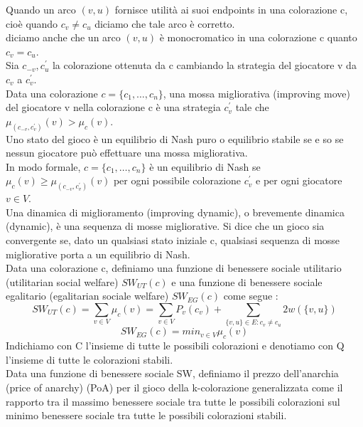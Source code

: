 Quando un arco \((v, u)\) fornisce utilità ai suoi endpoints in una colorazione c, cioè quando \(c_v \neq c_u\) diciamo che tale arco è corretto.\\

diciamo anche che un arco \((v, u)\) è monocromatico in una colorazione c quanto \(c_v = c_u\).\\

Sia \(c_{-v}, c_u^{\prime}\) la colorazione ottenuta da c cambiando la strategia del giocatore v da \(c_v\) a \(c_v^{\prime}\).\\

Data una colorazione \(c = \{c_1,\ldots,c_n\}\), una mossa migliorativa (improving move) del giocatore v nella colorazione c è una strategia \(c_v^{\prime}\) tale che \(\mu_{(c_{-v}, c_v^{\prime})} (v) > \mu_c (v)\).\\

Uno stato del gioco è un equilibrio di Nash puro o equilibrio stabile se e so se nessun giocatore può effettuare una mossa migliorativa.\\

In modo formale, \(c = \{c_1,\ldots,c_n\}\) è un equilibrio di Nash se \(\mu_c (v) \geq \mu_{(c_{-v}, c_v^{\prime})} (v)\) per ogni possibile colorazione \(c_v^{\prime}\) e per ogni giocatore \(v \in V\).\\

Una dinamica di miglioramento (improving dynamic), o brevemente dinamica (dynamic), è una sequenza di mosse migliorative. Si dice che un gioco sia convergente se, dato un qualsiasi stato iniziale c, qualsiasi sequenza di mosse migliorative porta a un equilibrio di Nash.\\

Data una colorazione c, definiamo una funzione di benessere sociale utilitario (utilitarian social welfare) \(SW_{UT}(c)\) e una funzione di benessere sociale egalitario (egalitarian sociale welfare) \(SW_{EG}(c)\) come segue :
\[SW_{UT} (c) = \sum_{v \in V} \mu_c (v) = \sum_{v \in V} P_v(c_v) + \sum_{\{v, u\} \in E : c_v \neq c_u} 2w(\{v, u\})\]
\[SW_{EG} (c) = min_{v \in V} \mu_c (v)\]
Indichiamo con C l'insieme di tutte le possibili colorazioni e denotiamo con Q l'insieme di tutte le colorazioni stabili.\\

Data una funzione di benessere sociale SW, definiamo il prezzo dell'anarchia (price of anarchy) (PoA) per il gioco della k-colorazione generalizzata come il rapporto tra il massimo benessere sociale tra tutte le possibili colorazioni sul minimo benessere sociale tra tutte le possibili colorazioni stabili.\\

